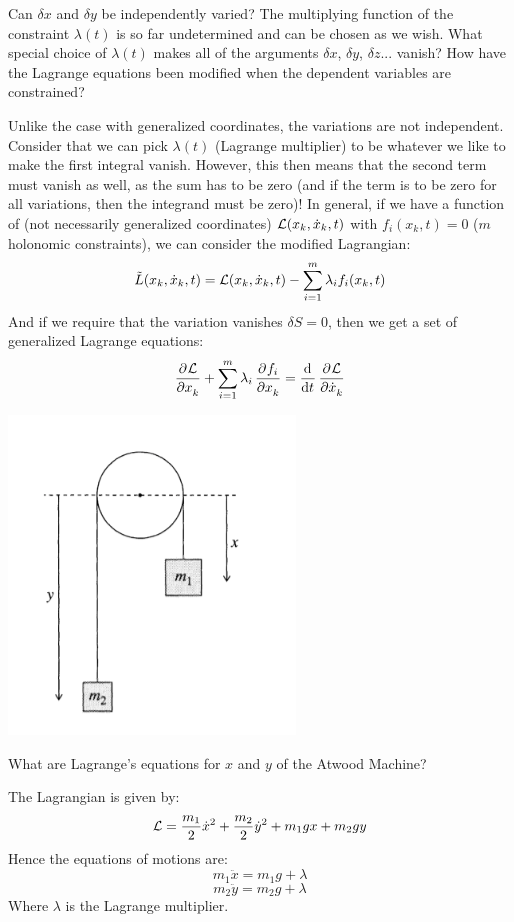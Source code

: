 \documentclass[../PHYS306Notes.tex]{subfiles}
\begin{document}
\begin{p}
Can $\delta x$ and $\delta y$ be independently varied? The multiplying function of the constraint $\lambda(t)$ is so far undetermined and can be chosen as we wish. What special choice of $\lambda(t)$ makes all of the arguments $\delta x$, $\delta y$, $\delta z$... vanish? How have the Lagrange equations been modified when the dependent variables are constrained?
\end{p}
\begin{s}
Unlike the case with generalized coordinates, the variations are not independent. Consider that we can pick $\lambda (t)$ (Lagrange multiplier) to be whatever we like to make the first integral vanish. However, this then means that the second term must vanish as well, as the sum has to be zero (and if the term is to be zero for all variations, then the integrand must be zero)! In general, if we have a function of (not necessarily generalized coordinates) $\mathcal{L}(x_k, \dot{x}_k, t)$ with $f_{i}(x_k, t) = 0$ ($m$ holonomic constraints), we can consider the modified Lagrangian:
\[\tilde{L}(x_k, \dot{x}_k, t) = \mathcal{L}(x_k, \dot{x}_k, t) - \sum_{i=1}^m \lambda_i f_i(x_k, t)\]
And if we require that the variation vanishes $\delta S = 0$, then we get a set of generalized Lagrange equations:
\[\dpd{\LL}{x_k} + \sum_{i=1}^m \lambda_i \dpd{f_i}{x_k} = \dod{}{t}\dpd{\LL}{\dot{x}_k}\]

\end{s}

\begin{center}
    \includegraphics[scale=0.75]{Lecture-8/w8-img1.png}
\end{center}
\begin{p}
What are Lagrange's equations for $x$ and $y$ of the Atwood Machine?
\end{p}
\begin{s}
The Lagrangian is given by:
\[\mathcal{L} = \frac{m_1}{2}\dot{x}^2 + \frac{m_2}{2}\dot{y}^2 + m_1gx + m_2gy\]
Hence the equations of motions are:
\[m_1\ddot{x} = m_1g + \lambda\]
\[m_2\ddot{y} = m_2g + \lambda\]
Where $\lambda$ is the Lagrange multiplier.
\end{s}
\end{document}
